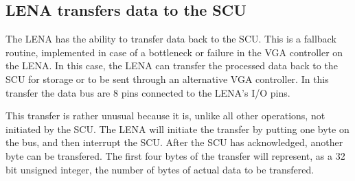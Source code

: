 
\subsection{LENA transfers data to the SCU}
The LENA has the ability to transfer data back to the SCU. This is a fallback routine, implemented in case of a bottleneck or failure in the VGA controller on the LENA. In this case, the LENA can transfer the processed data back to the SCU for storage or to be sent through an alternative VGA controller. In this transfer the data bus are 8 pins connected to the LENA's I/O pins.

This transfer is rather unusual because it is, unlike all other operations, not initiated by the SCU. The LENA will initiate the transfer by putting one byte on the bus, and then interrupt the SCU. After the SCU has acknowledged, another byte can be transfered. The first four bytes of the transfer will represent, as a 32 bit unsigned integer, the number of bytes of actual data to be transfered. %



